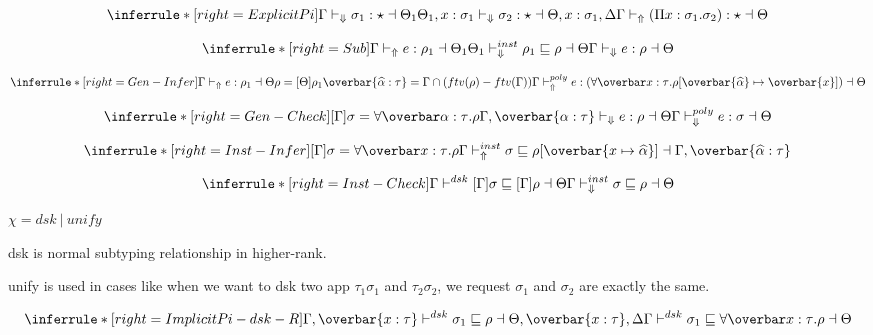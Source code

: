 \[
\inferrule*[right=ExplicitPi]
{\checktype \sigma_1 : \star \dashv \Theta_1 \\
\Theta_1, x:\sigma_1 \checktypeno \sigma_2 : \star \dashv \Theta, x:\sigma_1, \Delta
}
{\infertype (\Pi x : \sigma_1. \sigma_2) : \star \dashv \Theta}
\]

\[
\inferrule*[right=Sub]
{\infertype e : \rho_1 \dashv \Theta_1\\
\Theta_1 \instcheck \rho_1 \sqsubseteq \rho \dashv \Theta
}
{\checktype e: \rho \dashv \Theta}
\]



\[
\inferrule*[right=Gen-Infer]
{\infertype e :\rho_1 \dashv \Theta\\
\rho = [\Theta]\rho_1 \\
\overbar{\genA:\tau}=\Gamma \cap (ftv(\rho)-ftv(\Gamma))
}
{\polyinfer e :(\forallvars{x:\tau}. \rho[\overbar{\genA} \mapsto \overbar{x}]) \dashv \Theta}
\]

\[
\inferrule*[right=Gen-Check]
{
[\Gamma]\sigma = \forallvars{\alpha:\tau}. \rho \\
\Gamma, \overbar{\alpha:\tau} \checktypeno e :\rho \dashv \Theta
}
{\polycheck e : \sigma \dashv \Theta}
\]

\framebox{$ \Gamma \instinfercheck \sigma \sqsubseteq \rho \dashv \Theta$ }

\[
\inferrule*[right=Inst-Infer]
{[\Gamma] \sigma = \forallvars{x:\tau}. \rho
}
{\Gamma \instinfer \sigma \sqsubseteq \rho[\overbar{\tpmapsto {\tau} x {\genA}}] \dashv \Gamma, \overbar{\genA:\tau}}
\]

\[
\inferrule*[right=Inst-Check]
{\Gamma \dsk [\Gamma]\sigma \sqsubseteq [\Gamma]\rho \dashv \Theta} { \Gamma \instcheck \sigma \sqsubseteq \rho \dashv \Theta}
\]

\newpage

\newcommand{\dskunify}[0]{\vdash^{\chi}}
\framebox{$ \Gamma \dskunify \sigma_1 \sqsubseteq \sigma_2 \dashv \Theta$} $\chi = dsk~|~unify$

dsk is normal subtyping relationship in higher-rank.

unify is used in cases like when we want to dsk two app $\tau_1 \sigma_1$ and $\tau_2 \sigma_2$, we request $\sigma_1$ and $\sigma_2$ are exactly the same.

\[
\inferrule*[right=ImplicitPi-dsk-R]
{
\Gamma, \overbar{x:\tau} \dsk \sigma_1 \sqsubseteq \rho \dashv \Theta, \overbar{x:\tau}, \Delta}
{\Gamma \dsk \sigma_1 \sqsubseteq \forallvars{x:\tau}. \rho \dashv \Theta}
\]

